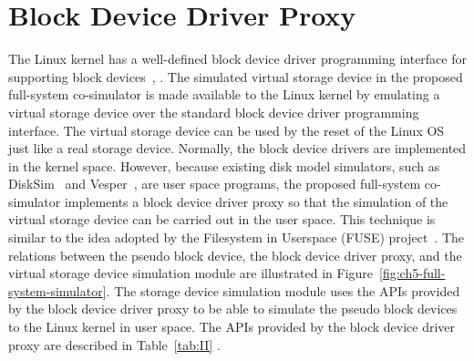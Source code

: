 \section{Block Device Driver Proxy}
\label{sec:storage-device-simulation-module}

The Linux kernel has a well-defined block device driver programming interface for supporting block devices~\cite{Corbet:2005}, \cite{Venkateswaran:2008}. The simulated virtual storage device in the proposed full-system co-simulator is made available to the Linux kernel by emulating a virtual storage device over the standard block device driver programming interface. The virtual storage device can be used by the reset of the Linux OS just like a real storage device. Normally, the block device drivers are implemented in the kernel space. However, because existing disk model simulators, such as DiskSim~\cite{Bucy:2008} and Vesper~\cite{DeRosa:2006}, are user space programs, the proposed full-system co-simulator implements a block device driver proxy so that the simulation of the virtual storage device can be carried out in the user space. This technique is similar to the idea adopted by the Filesystem in Userspace (FUSE) project~\cite{wiki:FUSE}. The relations between the pseudo block device, the block device driver proxy, and the virtual storage device simulation module are illustrated in Figure~\ref{fig:ch5-full-system-simulator}. The storage device simulation module uses the APIs provided by the block device driver proxy to be able to simulate the pseudo block devices to the Linux kernel in user space. The APIs provided by the block device driver proxy are described in Table~\ref{tab:II} .  

